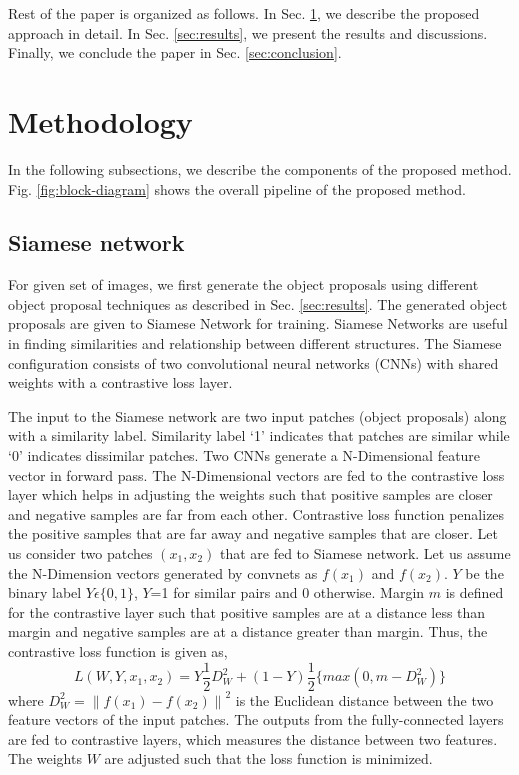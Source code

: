 \documentclass[conference]{IEEEtran}
\begin{document}
Rest of the paper is organized as follows. 
In Sec. \ref{sec:Methodology}, we describe the proposed approach in detail. In Sec. \ref{sec:results}, we present the results and discussions. Finally, we conclude the paper in Sec. \ref{sec:conclusion}.







\section{Methodology} \label{sec:Methodology}
In the following subsections, we describe the components of the proposed method. Fig. \ref{fig:block-diagram} shows the overall pipeline of the proposed method.
\subsection{Siamese network}
For given set of images, we first generate the object proposals using different object proposal techniques as described in Sec. \ref{sec:results}. The generated object proposals are given to Siamese Network for training. Siamese Networks are useful in finding similarities and relationship between different structures. The Siamese configuration consists of two convolutional neural networks (CNNs) with shared weights with a contrastive loss layer. 
\begin{figure*}[ht]
\centering
{}
\caption{Overall Architecture}
\label{fig:block-diagram}
\end{figure*}
The input to the Siamese network are two input patches (object proposals) along with a similarity label. Similarity label `1' indicates that patches are similar while `0' indicates dissimilar patches. Two CNNs generate a N-Dimensional feature vector in forward pass. The N-Dimensional vectors are fed to the contrastive loss layer which helps in adjusting the weights such that positive samples are closer and negative samples are far from each other. Contrastive loss function penalizes the positive samples that are far away and negative samples that are closer. Let us consider two  patches $(x_1,x_2)$ that are fed to Siamese network. Let us assume the N-Dimension vectors generated by convnets as $f(x_1)$ and $f(x_2)$. $Y$ be the binary label $Y\epsilon\{0,1\}$, $Y$=1 for similar pairs and 0 otherwise. Margin $m$ is defined for the contrastive layer such that positive samples are at a distance less than margin and negative samples are at a distance greater than margin. Thus, the contrastive loss function is given as,
\begin{equation}
     \textit{L}(W, Y, x_1,x_2)=Y\frac{1}{2} D_W^2 + (1-Y) \frac{1}{2}\{max(0,m-D_W^2)\}
\end{equation} 
where $D_W^2=\left \| f(x_1)-f(x_2) \right \|^2$ is the Euclidean distance between the two feature vectors of the input patches. The outputs from the fully-connected layers are fed to contrastive layers, which measures the distance between two features. The weights $W$ are adjusted such that the loss function is minimized.
\end{document}
